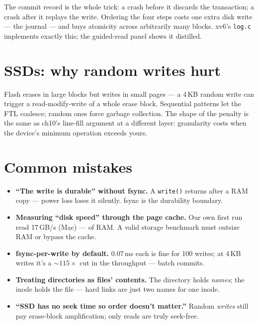 The commit record is the whole trick: a crash before it discards
the transaction; a crash after it replays the write. Ordering the
four steps costs one extra disk write --- the journal --- and buys
atomicity across arbitrarily many blocks. xv6's \texttt{log.c}
implements exactly this; the guided-read panel shows it distilled.



\section{SSDs: why random writes hurt}
\label{sec:ssd14}

Flash erases in large blocks but writes in small pages --- a
4\,KB random write can trigger a read-modify-write of a whole
erase block. Sequential patterns let the FTL coalesce; random ones
force garbage collection. The shape of the penalty is the same as
ch10's line-fill argument at a different layer: granularity costs
when the device's minimum operation exceeds yours.

\section{Common mistakes}
\label{sec:mistakes14}
\begin{itemize}
\item \textbf{``The write is durable'' without fsync.} A
      \texttt{write()} returns after a RAM copy --- power loss
      loses it silently. fsync is the durability boundary.
\item \textbf{Measuring ``disk speed'' through the page cache.}
      Our own first run read 17\,GB/s (Mac) --- of RAM. A valid storage
      benchmark must outsize RAM or bypass the cache.
\item \textbf{fsync-per-write by default.} 0.07\,ms each is fine
      for 100 writes; at 4\,KB writes it's a $\sim$$115\times$ cut in the
      throughput --- batch commits.
\item \textbf{Treating directories as files' contents.} The
      directory holds \emph{names}; the inode holds the file ---
      hard links are just two names for one inode.
\item \textbf{``SSD has no seek time so order doesn't matter.''}
      Random \emph{writes} still pay erase-block amplification;
      only reads are truly seek-free.
\end{itemize}

